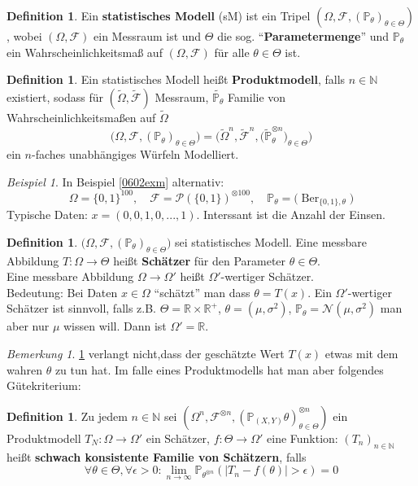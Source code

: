 \documentclass[10pt,a4paper]{article}
\newcommand{\N}{\ensuremath{\mathbb{N}}}
\newcommand{\R}{\ensuremath{\mathbb{R}}}
\newcommand{\abs}[1]{\left|#1\right|}
\newcommand{\potset}{\mathscr P}
\newcommand{\Prb}{\mathbb P}
\newcommand{\scF}{\ensuremath{\mathscr{F}}}
\newcommand{\Ber}{\operatorname{Ber}}
\newcommand{\Nv}{\mathscr N}
\theoremstyle{plain}
\theoremstyle{definition}
\newtheorem{definition}[theorem]{Definition}
\theoremstyle{remark}
\newtheorem*{bem*}{Bemerkung}
\newtheorem{exm}[theorem]{Beispiel}
\begin{document}
	\begin{definition}
		Ein \textbf{statistisches Modell} (sM) ist ein Tripel $(\Omega,\scF,(\Prb_\theta)_{\theta\in\Theta})$, wobei $(\Omega,\scF)$ ein Messraum ist und $\Theta$ die sog. \enquote{\textbf{Parametermenge}} und $\Prb_\theta$ ein Wahrscheinlichkeitsmaß auf $(\Omega,\scF)$ für alle $\theta\in\Theta$ ist.
	\end{definition}

	\begin{definition}
		Ein statistisches Modell heißt \textbf{Produktmodell}, falls $n\in\N$ existiert, sodass für $(\tilde{\Omega},\tilde{\scF})$ Messraum, $\tilde{\Prb_\theta}$ Familie von Wahrscheinlichkeitsmaßen auf $\tilde\Omega$
		\[\big(\Omega,\scF,(\Prb_\theta)_{\theta\in\Theta}\big)=\big(\tilde{\Omega}^n,\tilde{\scF}^n,\big(\tilde{\Prb}_\theta^{\otimes n}\big)_{\theta\in\Theta}\big)\]
		ein $n$-faches unabhängiges Würfeln Modelliert.
	\end{definition}

	\begin{exm}
		In Beispiel \ref{0602exm} alternativ:
		\[\Omega=\{0,1\}^{100},\quad\scF=\potset(\{0,1\})^{\otimes 100},\quad\Prb_{\theta}=\big(\Ber_{\{0,1\},\theta}\big)\]
		Typische Daten: $x=(0,0,1,0,...,1)$. Interssant ist die Anzahl der Einsen.
	\end{exm}

	\begin{definition}\label{0607def}
		$\big(\Omega,\scF,(\Prb_\theta)_{\theta\in\Theta}\big)$ sei statistisches Modell. Eine messbare Abbildung $T:\Omega\to\Theta$ heißt \textbf{Schätzer} für den Parameter $\theta\in\Theta$.\\
		Eine messbare Abbildung $\Omega\to\Omega'$ heißt $\Omega'$-wertiger Schätzer.\\
		Bedeutung: Bei Daten $x\in\Omega$ \enquote{schätzt} man dass $\theta=T(x)$. Ein $\Omega'$-wertiger Schätzer ist sinnvoll, falls z.B. $\Theta=\R\times \R^+$, $\theta=(\mu,\sigma^2)$, $\Prb_\theta=\Nv(\mu,\sigma^2)$ man aber nur $\mu$ wissen will. Dann ist $\Omega'=\R$.
	\end{definition}

	\begin{bem*}
		\ref{0607def} verlangt nicht,dass der geschätzte Wert $T(x)$ etwas mit dem wahren $\theta$ zu tun hat. Im falle eines Produktmodells hat man aber folgendes Gütekriterium:
	\end{bem*}

	\begin{definition}\label{0608def}
		Zu jedem $n\in\N$ sei $(\Omega^n,\scF^{\otimes n},\left(\Prb_{(X,Y)}\theta\right)^{\otimes n}_{\theta\in\Theta})$ ein Produktmodell $T_N:\Omega\to\Omega'$ ein Schätzer, $f:\Theta\to\Omega'$ eine Funktion: $(T_n)_{n\in\N}$ heißt \textbf{schwach konsistente Familie von Schätzern}, falls
		\[\forall\theta\in\Theta,\forall\epsilon>0:\lim\limits_{n\to\infty}\Prb_{\theta^{\otimes n}}\left(\abs{T_n-f(\theta)}>\epsilon\right)=0\]
	\end{definition}
\end{document}
